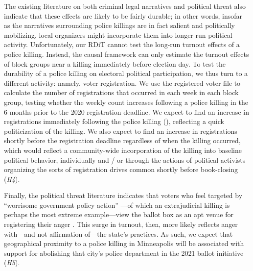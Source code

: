 \documentclass[12pt]{article}
\begin{document}
The existing literature on both criminal legal narratives and political threat also indicate that these effects are likely to be fairly durable; in other words, insofar as the narratives surrounding police killings are in fact salient and politically mobilizing, local organizers might incorporate them into longer-run political activity. Unfortunately, our RDiT cannot test the long-run turnout effects of a police killing. Instead, the causal framework can only estimate the turnout effects of block groups near a killing immediately before election day. To test the durability of a police killing on electoral political participation, we thus turn to a different activity: namely, voter registration. We use the registered voter file to calculate the number of registrations that occurred in each week in each block group, testing whether the weekly count increases following a police killing in the 6 months prior to the 2020 registration deadline. We expect to find an increase in registrations immediately following the police killing (), reflecting a quick politicization of the killing. We also expect to find an increase in registrations shortly before the registration deadline regardless of when the killing occurred, which would reflect a community-wide incorporation of the killing into baseline political behavior, individually and / or through the actions of political activists organizing the sorts of registration drives common shortly before book-closing (\textit{H4}).

Finally, the political threat literature indicates that voters who feel targeted by ``worrisome government policy action'' \citep[][977]{TamCho2006a}---of which an extrajudicial killing is perhaps the most extreme example---view the ballot box as an apt venue for registering their anger \citep[e.g., ][]{White2016, Zepeda-Millan2017, Towler2018}. This surge in turnout, then, more likely reflects anger with---and not affirmation of---the state's practices. As such, we expect that geographical proximity to a police killing in Minneapolis will be associated with support for abolishing that city's police department in the 2021 ballot initiative (\textit{H5}).
\end{document}
